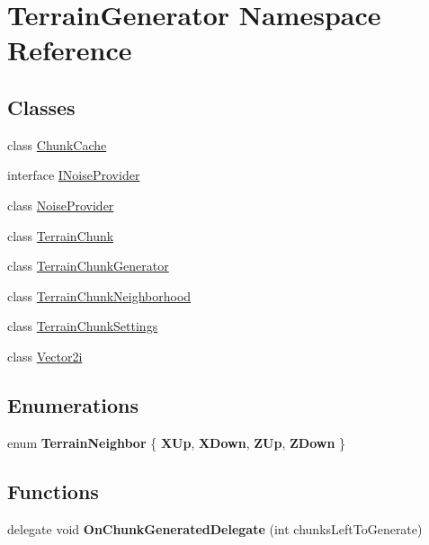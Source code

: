 \hypertarget{namespace_terrain_generator}{}\section{Terrain\+Generator Namespace Reference}
\label{namespace_terrain_generator}
\subsection*{Classes}
\begin{DoxyCompactItemize}
\item 
class \hyperlink{class_terrain_generator_1_1_chunk_cache}{Chunk\+Cache}
\item 
interface \hyperlink{interface_terrain_generator_1_1_i_noise_provider}{I\+Noise\+Provider}
\item 
class \hyperlink{class_terrain_generator_1_1_noise_provider}{Noise\+Provider}
\item 
class \hyperlink{class_terrain_generator_1_1_terrain_chunk}{Terrain\+Chunk}
\item 
class \hyperlink{class_terrain_generator_1_1_terrain_chunk_generator}{Terrain\+Chunk\+Generator}
\item 
class \hyperlink{class_terrain_generator_1_1_terrain_chunk_neighborhood}{Terrain\+Chunk\+Neighborhood}
\item 
class \hyperlink{class_terrain_generator_1_1_terrain_chunk_settings}{Terrain\+Chunk\+Settings}
\item 
class \hyperlink{class_terrain_generator_1_1_vector2i}{Vector2i}
\end{DoxyCompactItemize}
\subsection*{Enumerations}
\begin{DoxyCompactItemize}
\item 
\mbox{\label{namespace_terrain_generator_aad5d5b11e05841a24d0fa90f44f474fc}} 
enum {\bfseries Terrain\+Neighbor} \{ {\bfseries X\+Up}, 
{\bfseries X\+Down}, 
{\bfseries Z\+Up}, 
{\bfseries Z\+Down}
 \}
\end{DoxyCompactItemize}
\subsection*{Functions}
\begin{DoxyCompactItemize}
\item 
\mbox{\label{namespace_terrain_generator_a051189c91632502312d4e5c4fd63d57f}} 
delegate void {\bfseries On\+Chunk\+Generated\+Delegate} (int chunks\+Left\+To\+Generate)
\end{DoxyCompactItemize}

